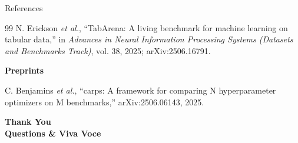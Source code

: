 \documentclass[aspectratio=169, 11pt]{beamer}
\begin{document}
\begin{frame}[allowframebreaks]{References}
\begin{thebibliography}{99}
 N. Erickson \textit{et al.}, ``TabArena: A living benchmark for machine learning on tabular data,'' in \textit{Advances in Neural Information Processing Systems (Datasets and Benchmarks Track)}, vol. 38, 2025; arXiv:2506.16791.

\item[] \textbf{Preprints}

 C. Benjamins \textit{et al.}, ``carps: A framework for comparing N hyperparameter optimizers on M benchmarks,'' arXiv:2506.06143, 2025.

\end{thebibliography}
\end{frame}

\begin{frame}
    \centering
    {\Huge \textbf{\textcolor{amritaMaroon}{Thank You}}} \\[0.4cm]
    {\large \textbf{Questions \& Viva Voce}}
\end{frame}
\end{document}
